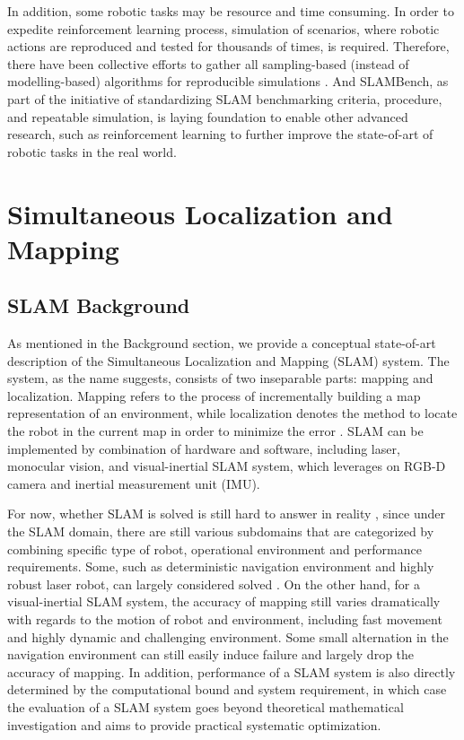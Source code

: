 In addition, some robotic tasks may be resource and time consuming. In order to expedite reinforcement learning process, simulation of scenarios, where robotic actions are reproduced and tested for thousands of times, is required. 
Therefore, there have been collective efforts to gather all sampling-based (instead of modelling-based) algorithms for reproducible simulations \cite{sucan2019open}. 
And SLAMBench, as part of the initiative of standardizing SLAM benchmarking criteria, procedure, and repeatable simulation, is laying foundation to enable other advanced research, such as reinforcement learning to further improve the state-of-art of robotic tasks in the real world.


\section{Simultaneous Localization and Mapping}
\subsection{SLAM Background}
As mentioned in the Background section, we provide a conceptual state-of-art description of the Simultaneous Localization and Mapping (SLAM) system. 
The system, as the name suggests, consists of two inseparable parts: mapping and localization. 
Mapping refers to the process of incrementally building a map representation of an environment, while localization denotes the method to locate the robot in the current map in order to minimize the error \cite{perera2014exploration}.
SLAM can be implemented by combination of hardware and software, including laser, monocular vision, and visual-inertial SLAM system, which leverages on RGB-D camera and inertial measurement unit (IMU).

For now, whether SLAM is solved is still hard to answer in reality \cite{frese2010interview}, since under the SLAM domain, there are still various subdomains that are categorized by combining specific type of robot, operational environment and performance requirements. 
Some, such as deterministic navigation environment and highly robust laser robot, can largely considered solved \cite{roboticskuka}. 
On the other hand, for a visual-inertial SLAM system, the accuracy of mapping still varies dramatically with regards to the motion of robot and environment, including fast movement and highly dynamic and challenging environment. 
Some small alternation in the navigation environment can still easily induce failure and largely drop the accuracy of mapping. 
In addition, performance of a SLAM system is also directly determined by the computational bound and system requirement, in which case the evaluation of a SLAM system goes beyond theoretical mathematical investigation and aims to provide practical systematic optimization.

